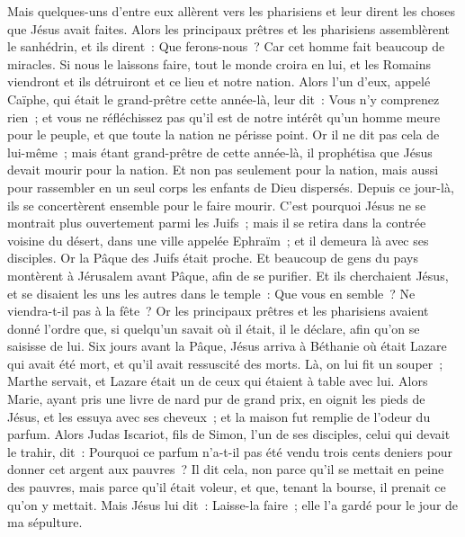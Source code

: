 \begin{multicols}{2}
Mais quelques-uns d'entre eux allèrent vers les pharisiens et leur dirent les choses que Jésus avait faites.
Alors les principaux prêtres et les pharisiens assemblèrent le sanhédrin, et ils dirent~: Que ferons-nous~? Car cet homme fait beaucoup de miracles.
Si nous le laissons faire, tout le monde croira en lui, et les Romains viendront et ils détruiront et ce lieu et notre nation.
Alors l'un d'eux, appelé Caïphe, qui était le grand-prêtre cette année-là, leur dit~: Vous n'y comprenez rien~;
et vous ne réfléchissez pas qu'il est de notre intérêt qu'un homme meure pour le peuple, et que toute la nation ne périsse point.
Or il ne dit pas cela de lui-même~; mais étant grand-prêtre de cette année-là, il prophétisa que Jésus devait mourir pour la nation.
Et non pas seulement pour la nation, mais aussi pour rassembler en un seul corps les enfants de Dieu dispersés.
Depuis ce jour-là, ils se concertèrent ensemble pour le faire mourir.
C'est pourquoi Jésus ne se montrait plus ouvertement parmi les Juifs~; mais il se retira dans la contrée voisine du désert, dans une ville appelée Ephraïm~; et il demeura là avec ses disciples.
Or la Pâque des Juifs était proche. Et beaucoup de gens du pays montèrent à Jérusalem avant Pâque, afin de se purifier.
Et ils cherchaient Jésus, et se disaient les uns les autres dans le temple~: Que vous en semble~? Ne viendra-t-il pas à la fête~?
Or les principaux prêtres et les pharisiens avaient donné l'ordre que, si quelqu'un savait où il était, il le déclare, afin qu'on se saisisse de lui.
\VerseOne{}Six jours avant la Pâque, Jésus arriva à Béthanie où était Lazare qui avait été mort, et qu'il avait ressuscité des morts.
Là, on lui fit un souper~; Marthe servait, et Lazare était un de ceux qui étaient à table avec lui.
Alors Marie, ayant pris une livre de nard pur de grand prix, en oignit les pieds de Jésus, et les essuya avec ses cheveux~; et la maison fut remplie de l'odeur du parfum.
Alors Judas Iscariot, fils de Simon, l'un de ses disciples, celui qui devait le trahir, dit~:
Pourquoi ce parfum n'a-t-il pas été vendu trois cents deniers pour donner cet argent aux pauvres~?
Il dit cela, non parce qu'il se mettait en peine des pauvres, mais parce qu'il était voleur, et que, tenant la bourse, il prenait ce qu'on y mettait.
Mais Jésus lui dit~: Laisse-la faire~; elle l'a gardé pour le jour de ma sépulture.

\end{multicols}
